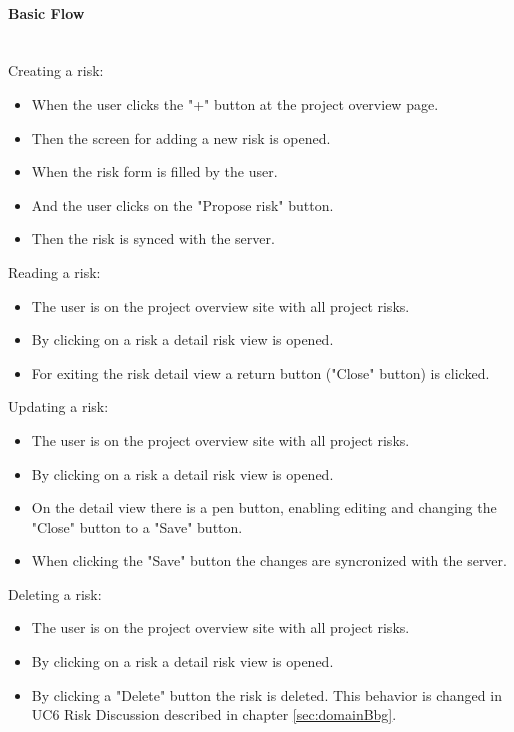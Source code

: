 \newpage
\paragraph*{Basic Flow} \mbox{}\\
\noindent
Creating a risk:
\begin{itemize}
	\vspace{-3mm}
	\setlength\itemsep{-1em}
	\item  When the user clicks the "+" button at the project overview page.
	\item Then the screen for adding a new risk is opened.
	\item When the risk form is filled by the user.
	\item And the user clicks on the "Propose risk" button.
	\item Then the risk is synced with the server.
\end{itemize}

\noindent
Reading a risk:
\begin{itemize}
	\vspace{-3mm}
	\setlength\itemsep{-1em}
	\item The user is on the project overview site with all project risks.
	\item By clicking on a risk a detail risk view is opened.
	\item For exiting the risk detail view a return button ("Close" button) is clicked.
\end{itemize}

\noindent
Updating a risk: 
\begin{itemize}
	\vspace{-3mm}
	\setlength\itemsep{-1em}
	\item The user is on the project overview site with all project risks.
	\item By clicking on a risk a detail risk view is opened.
	\item On the detail view there is a pen button, enabling editing and changing the "Close" button to a "Save" button.
	\item When clicking the "Save" button the changes are syncronized with the server.
\end{itemize} 

\noindent
Deleting a risk:
\begin{itemize}
	\vspace{-3mm}
	\setlength\itemsep{-1em}
	\item The user is on the project overview site with all project risks.
	\item By clicking on a risk a detail risk view is opened.
	\item By clicking a "Delete" button the risk is deleted. This behavior is changed in UC6 Risk Discussion described in chapter \ref{sec:domainBbg}.
\end{itemize}

